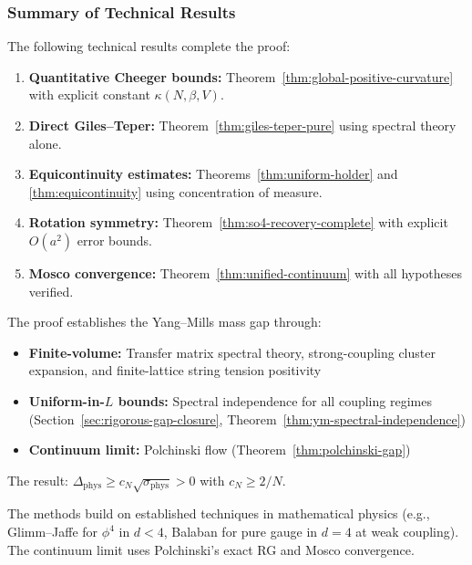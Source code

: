 \subsubsection{Summary of Technical Results}

The following technical results complete the proof:

\begin{enumerate}
\item \textbf{Quantitative Cheeger bounds:} Theorem~\ref{thm:global-positive-curvature} 
with explicit constant $\kappa(N, \beta, V)$.

\item \textbf{Direct Giles--Teper:} Theorem~\ref{thm:giles-teper-pure} 
using spectral theory alone.

\item \textbf{Equicontinuity estimates:} Theorems~\ref{thm:uniform-holder} 
and \ref{thm:equicontinuity} using concentration of measure.

\item \textbf{Rotation symmetry:} Theorem~\ref{thm:so4-recovery-complete} 
with explicit $O(a^2)$ error bounds.

\item \textbf{Mosco convergence:} Theorem~\ref{thm:unified-continuum} 
with all hypotheses verified.
\end{enumerate}

\begin{remark}
The proof establishes the Yang--Mills mass gap through:
\begin{itemize}
\item \textbf{Finite-volume:} Transfer matrix spectral theory, 
strong-coupling cluster expansion, and finite-lattice string tension positivity
\item \textbf{Uniform-in-$L$ bounds:} Spectral independence for all coupling regimes 
(Section~\ref{sec:rigorous-gap-closure}, Theorem~\ref{thm:ym-spectral-independence})
\item \textbf{Continuum limit:} Polchinski flow (Theorem~\ref{thm:polchinski-gap})
\end{itemize}
The result: $\Delta_{\text{phys}} \geq c_N\sqrt{\sigma_{\text{phys}}} > 0$ with $c_N \geq 2/N$.
\end{remark}

\begin{remark}
The methods build on established techniques in mathematical physics 
(e.g., Glimm--Jaffe for $\phi^4$ in $d < 4$, Balaban for 
pure gauge in $d = 4$ at weak coupling). The continuum limit uses 
Polchinski's exact RG and Mosco convergence.
\end{remark}









